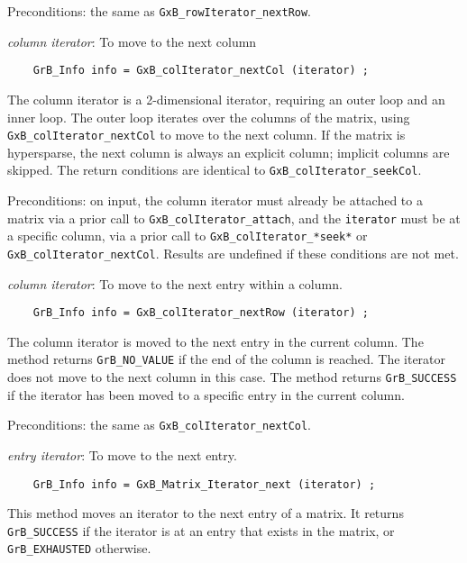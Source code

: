 \documentclass[12pt]{article}
\begin{document}
\begin{enumerate}
    Preconditions: the same as \verb'GxB_rowIterator_nextRow'.

    \item {\em column iterator}:  To move to the next column

    {\footnotesize
    \begin{verbatim}
    GrB_Info info = GxB_colIterator_nextCol (iterator) ; \end{verbatim}}

    The column iterator is a 2-dimensional iterator, requiring an outer loop
    and an inner loop.  The outer loop iterates over the columns of the matrix,
    using \verb'GxB_colIterator_nextCol' to move to the next column.  If the
    matrix is hypersparse, the next column is always an explicit column;
    implicit columns are skipped.  The return conditions are identical to
    \verb'GxB_colIterator_seekCol'.

    Preconditions: on input, the column iterator must already be attached to a
    matrix via a prior call to \verb'GxB_colIterator_attach', and the
    \verb'iterator' must be at a specific column, via a prior call to
    \verb'GxB_colIterator_*seek*' or \verb'GxB_colIterator_nextCol'.
    Results are undefined if these conditions are not met.

    {\footnotesize
    \item {\em column iterator}:  To move to the next entry within a column.

    \begin{verbatim}
    GrB_Info info = GxB_colIterator_nextRow (iterator) ; \end{verbatim}}

    The column iterator is moved to the next entry in the current column.
    The method returns \verb'GrB_NO_VALUE' if the end of the column is reached.
    The iterator does not move to the next column in this case.
    The method returns \verb'GrB_SUCCESS' if the iterator has been moved
    to a specific entry in the current column.

    Preconditions: the same as \verb'GxB_colIterator_nextCol'.

    \item {\em entry iterator}: To move to the next entry.
    {\footnotesize
    \begin{verbatim}
    GrB_Info info = GxB_Matrix_Iterator_next (iterator) ; \end{verbatim}}

    This method moves an iterator to the next entry of a matrix.
    It returns \verb'GrB_SUCCESS' if the iterator is at an entry that
    exists in the matrix, or \verb'GrB_EXHAUSTED' otherwise.


\end{enumerate}
\end{document}
